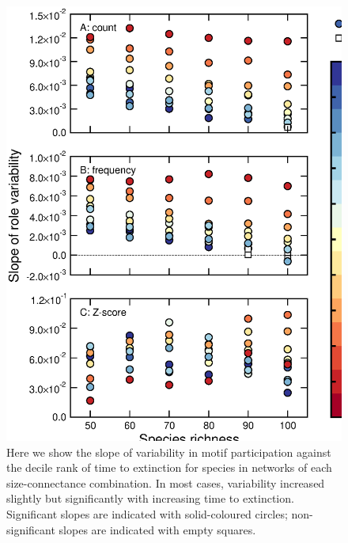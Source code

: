 \documentclass[12pt]{article}
\begin{document}
		\begin{figure}[hb!]
		    \centering
			\caption{Here we show the slope of variability in motif participation against the decile rank of time to extinction for species in networks of each size-connectance combination. In most cases, variability increased slightly but significantly with increasing time to extinction. Significant slopes are indicated with solid-coloured circles; non-significant slopes are indicated with empty squares.}
			\label{fig:dispfig}
			\includegraphics[height=.65\textheight]{figures/dispersion_lms.eps}
			\end{figure}
        
\end{document}
